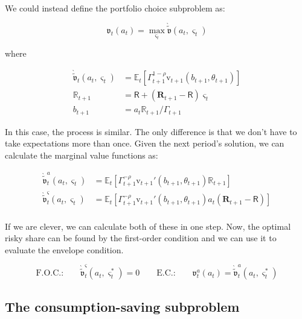 \documentclass{article}
\newcommand{\tShkEmp}{\theta}
\newcommand{\Ex}{\mathbb{E}}
\newcommand{\CRRA}{\rho}
\newcommand{\bRat}{b}
\newcommand{\vFunc}{\mathrm{v}}
\newcommand{\Rfree}{\mathsf{R}}
\newcommand{\riskyshare}{\varsigma}
\newcommand{\PGro}{\Gamma}
\newcommand{\aRat}{a}
\newcommand{\Rport}{\mathbb{R}}
\newcommand{\Risky}{\mathbf{R}}
\newcommand{\vEnd}{\mathfrak{v}}
\newcommand{\vOptAlt}{\grave{\tilde{\mathfrak{v}}}}
\begin{document}
We could instead define the portfolio choice subproblem as:

\begin{equation}
\vEnd_{t}(\aRat_{t}) = \max_{\riskyshare_{t}} \vOptAlt(\aRat_{t}, \riskyshare_{t})
\end{equation}

where

\begin{equation}
\begin{split}
    \vOptAlt_{t}(\aRat_{t}, \riskyshare_{t}) & =  \Ex_{t} \left[ \PGro_{t+1}^{1-\CRRA} \vFunc_{t+1}\left(\bRat_{t+1}, \tShkEmp_{t+1}\right)   \right] \\
    \Rport_{t+1} & = \Rfree + (\Risky_{t+1} - \Rfree) \riskyshare_{t} \\
    \bRat_{t+1} & = \aRat_{t} \Rport_{t+1} / \PGro_{t+1}
  \end{split}
\end{equation}

In this case, the process is similar. The only difference is that we don't have to take expectations more than once. Given the next period's solution, we can calculate the marginal value functions as:

\begin{equation}
\begin{split}
    \vOptAlt_{t}^{\aRat}(\aRat_{t}, \riskyshare_{t}) & =  \Ex_{t} \left[ \PGro_{t+1}^{-\CRRA} \vFunc_{t+1}'\left(\bRat_{t+1}, \tShkEmp_{t+1}\right) \Rport_{t+1}   \right] \\
    \vOptAlt_{t}^{\riskyshare}(\aRat_{t}, \riskyshare_{t}) & =  \Ex_{t} \left[ \PGro_{t+1}^{-\CRRA} \vFunc_{t+1}'\left(\bRat_{t+1}, \tShkEmp_{t+1}\right) \aRat_{t} (\Risky_{t+1} - \Rfree)   \right] \\
  \end{split}
\end{equation}

If we are clever, we can calculate both of these in one step. Now, the optimal risky share can be found by the first-order condition and we can use it to evaluate the envelope condition.

\begin{equation}
\text{F.O.C.:} \qquad \vOptAlt_{t}^{\riskyshare}(\aRat_{t}, \riskyshare_{t}^{*})  = 0 \qquad
  \text{E.C.:} \qquad \vEnd_{t}^{\aRat}(\aRat_{t}) = \vOptAlt_{t}^{\aRat}(\aRat_{t}, \riskyshare_{t}^{*})
\end{equation}

\subsection{The consumption-saving subproblem}\label{The consumption-saving subproblem}
\end{document}
